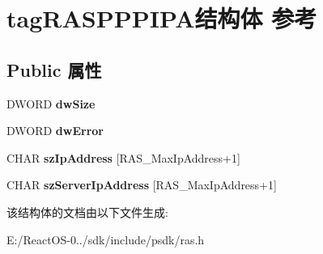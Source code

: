 \hypertarget{structtag_r_a_s_p_p_p_i_p_a}{}\section{tag\+R\+A\+S\+P\+P\+P\+I\+P\+A结构体 参考}
\label{structtag_r_a_s_p_p_p_i_p_a}
\subsection*{Public 属性}
\begin{DoxyCompactItemize}
\item 
\mbox{\label{structtag_r_a_s_p_p_p_i_p_a_ae9fdc0720558a8a42170ec73e224ea38}} 
D\+W\+O\+RD {\bfseries dw\+Size}
\item 
\mbox{\label{structtag_r_a_s_p_p_p_i_p_a_a79a12a28cfff4408c92424ac6c01d0c3}} 
D\+W\+O\+RD {\bfseries dw\+Error}
\item 
\mbox{\label{structtag_r_a_s_p_p_p_i_p_a_a5f562218ac6cd55a04841ad1f2d9045f}} 
C\+H\+AR {\bfseries sz\+Ip\+Address} \mbox{[}R\+A\+S\+\_\+\+Max\+Ip\+Address+1\mbox{]}
\item 
\mbox{\label{structtag_r_a_s_p_p_p_i_p_a_ad2b9730c8d66972b3152c2ab86398d87}} 
C\+H\+AR {\bfseries sz\+Server\+Ip\+Address} \mbox{[}R\+A\+S\+\_\+\+Max\+Ip\+Address+1\mbox{]}
\end{DoxyCompactItemize}


该结构体的文档由以下文件生成\+:\begin{DoxyCompactItemize}
\item 
E\+:/\+React\+O\+S-\/0../sdk/include/psdk/ras.\+h\end{DoxyCompactItemize}
